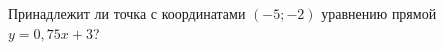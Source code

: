 \begin{ex}
	\begin{condition}
		Принадлежит ли точка с координатами \( (-5;-2) \) уравнению прямой \( y=0,75x+3 \)?
	\end{condition}
\end{ex}